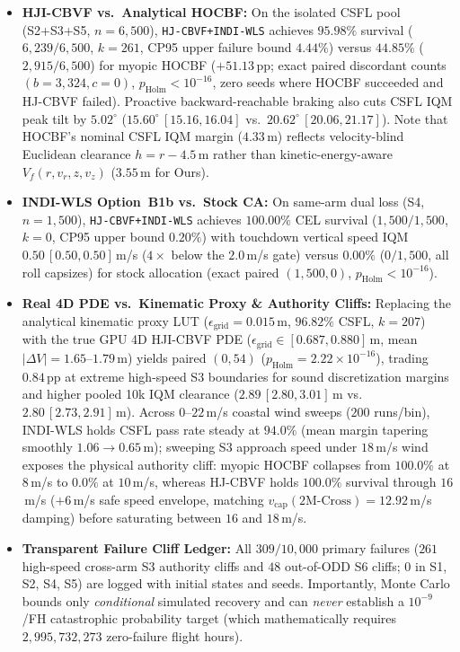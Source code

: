 \documentclass[letterpaper, 10 pt, journal, twoside]{IEEEtran}
\begin{document}
\begin{itemize}
  \item \textbf{HJI-CBVF vs.\ Analytical HOCBF:} On the isolated CSFL pool (S2+S3+S5, $n=6{,}500$), \texttt{HJ-CBVF+INDI-WLS} achieves $95.98\%$ survival ($6{,}239/6{,}500$, $k=261$, CP95 upper failure bound $4.44\%$) versus $44.85\%$ ($2{,}915/6{,}500$) for myopic HOCBF ($+51.13$\,pp; exact paired discordant counts $(b=3{,}324, c=0)$, $p_{\text{Holm}}<10^{-16}$, zero seeds where HOCBF succeeded and HJ-CBVF failed). Proactive backward-reachable braking also cuts CSFL IQM peak tilt by $5.02^\circ$ ($15.60^\circ\,[15.16,16.04]$ vs.\ $20.62^\circ\,[20.06,21.17]$). Note that HOCBF's nominal CSFL IQM margin ($4.33$\,m) reflects velocity-blind Euclidean clearance $h=r-4.5$\,m rather than kinetic-energy-aware $V_f(r,v_r,z,v_z)$ ($3.55$\,m for Ours).
  \item \textbf{INDI-WLS Option~B1b vs.\ Stock CA:} On same-arm dual loss (S4, $n=1{,}500$), \texttt{HJ-CBVF+INDI-WLS} achieves $100.00\%$ CEL survival ($1{,}500/1{,}500$, $k=0$, CP95 upper bound $0.20\%$) with touchdown vertical speed IQM $0.50\,[0.50,0.50]$\,m/s ($4\times$ below the $2.0$\,m/s gate) versus $0.00\%$ ($0/1{,}500$, all roll capsizes) for stock allocation (exact paired $(1{,}500,0)$, $p_{\text{Holm}}<10^{-16}$).
  \item \textbf{Real 4D PDE vs.\ Kinematic Proxy \& Authority Cliffs:} Replacing the analytical kinematic proxy LUT ($\epsilon_{\text{grid}}=0.015$\,m, $96.82\%$ CSFL, $k=207$) with the true GPU 4D HJI-CBVF PDE ($\epsilon_{\text{grid}}\in[0.687,0.880]$\,m, mean $|\Delta V|=1.65$--$1.79$\,m) yields paired $(0,54)$ ($p_{\text{Holm}}=2.22\times 10^{-16}$), trading $0.84$\,pp at extreme high-speed S3 boundaries for sound discretization margins and higher pooled 10k IQM clearance ($2.89\,[2.80,3.01]$\,m vs.\ $2.80\,[2.73,2.91]$\,m). Across $0$--$22$\,m/s coastal wind sweeps ($200$ runs/bin), INDI-WLS holds CSFL pass rate steady at $94.0\%$ (mean margin tapering smoothly $1.06\to 0.65$\,m); sweeping S3 approach speed under $18$\,m/s wind exposes the physical authority cliff: myopic HOCBF collapses from $100.0\%$ at $8$\,m/s to $0.0\%$ at $10$\,m/s, whereas HJ-CBVF holds $100.0\%$ survival through $16$\,m/s ($+6$\,m/s safe speed envelope, matching $v_{\text{cap}}(\text{2M-Cross})=12.92$\,m/s damping) before saturating between $16$ and $18$\,m/s.
  \item \textbf{Transparent Failure Cliff Ledger:} All $309/10{,}000$ primary failures ($261$ high-speed cross-arm S3 authority cliffs and $48$ out-of-ODD S6 cliffs; $0$ in S1, S2, S4, S5) are logged with initial states and seeds. Importantly, Monte Carlo bounds only \emph{conditional} simulated recovery and can \emph{never} establish a $10^{-9}$/FH catastrophic probability target (which mathematically requires $2{,}995{,}732{,}273$ zero-failure flight hours).
\end{itemize}
\end{document}

